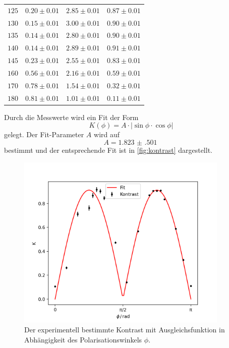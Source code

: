 \begin{table}
\begin{tabular}{c c c c}
        $125$ &   $ 0.20\pm 0.01$ & $  	2.85 \pm 0.01$ &  $ 0.87 \pm 0.01 $ \\
        $130$ &   $ 0.15\pm 0.01$ & $  	3.00 \pm 0.01$ &  $ 0.90 \pm 0.01 $ \\
        $135$ &   $ 0.14\pm 0.01$ & $  	2.80 \pm 0.01$ &  $ 0.90 \pm 0.01 $ \\
        $140$ &   $ 0.14\pm 0.01$ & $  	2.89 \pm 0.01$ &  $ 0.91 \pm 0.01 $ \\
        $145$ &   $ 0.23\pm 0.01$ & $  	2.55 \pm 0.01$ &  $ 0.83 \pm 0.01 $ \\
        $160$ &   $ 0.56\pm 0.01$ & $  	2.16 \pm 0.01$ &  $ 0.59 \pm 0.01 $ \\
        $170$ &   $ 0.78\pm 0.01$ & $  	1.54 \pm 0.01$ &  $ 0.32 \pm 0.01 $ \\
        $180$ &   $ 0.81\pm 0.01$ & $  	1.01 \pm 0.01$ &  $ 0.11 \pm 0.01 $ \\
        \bottomrule
    \end{tabular}
\end{table}
Durch die Messwerte wird ein Fit der Form 
\begin{equation*}
    K(\phi) = A \cdot |\sin{\phi} \cdot \cos{\phi}|
\end{equation*}
gelegt.
Der Fit-Parameter $A$ wird auf
\begin{equation*}
    A = \qty{1.823(501)}{}
\end{equation*}
bestimmt und der entsprechende Fit ist in \autoref{fig:kontrast} dargestellt.
\begin{figure}
    \centering
    \includegraphics[width=0.9\textwidth]{python/kontrast.png}
    \caption{Der experimentell bestimmte Kontrast mit Ausgleichsfunktion in Abhängigkeit des Polarisationswinkels $\phi$.}
    \label{fig:kontrast}
\end{figure}
\FloatBarrier

